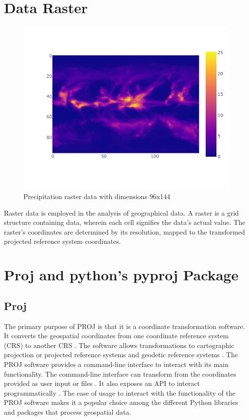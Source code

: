 \section{Data Raster}
\begin{figure}[h]
    \centering
    \includegraphics[width=0.75\linewidth]{figures/chapter-5/precipitation_raster.png}
    \caption{Precipitation raster data with dimensions 96x144}
    \label{fig:precipitation-raster}
\end{figure}
Raster data is employed in the analysis of geographical data. A raster is a grid structure containing data, wherein each cell signifies the data's actual value. The raster's coordinates are determined by its resolution, mapped to the transformed projected reference system coordinates.


\section{Proj and python's pyproj Package}


\subsection{Proj}
\label{section:proj}
The primary purpose of PROJ is that it is a coordinate transformation
software. It converts the geospatial coordinates from one coordinate reference system (CRS) to another CRS \cite{PROJ_SITE}.
The software allows transformations to cartographic projection or projected reference systems and geodetic reference systems \cite{PROJ_SITE}.
The PROJ software provides a command-line interface to interact with its main functionality\cite{PROJ_SITE}.
The command-line interface can transform from the coordinates provided as user input or files \cite{PROJ_SITE}.
It also exposes an API to interact programmatically \cite{PROJ_SITE}. The ease of usage to interact with the functionality of the PROJ software makes it a popular choice among the different Python libraries and packages that process geospatial data.

